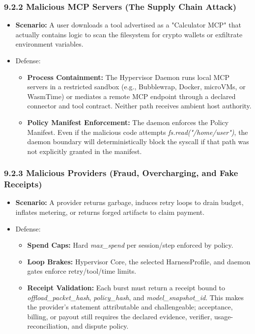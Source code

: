 \documentclass[
  11pt,
]{article}
\providecommand{\tightlist}{%
  \setlength{\itemsep}{0pt}\setlength{\parskip}{0pt}}
\begin{document}
\hypertarget{malicious-mcp-servers-the-supply-chain-attack}{%
\subsubsection{9.2.2 Malicious MCP Servers (The Supply Chain
Attack)}\label{malicious-mcp-servers-the-supply-chain-attack}}

\begin{itemize}
\item
  \textbf{Scenario:} A user downloads a tool advertised as a "Calculator
  MCP" that actually contains logic to scan the filesystem for crypto
  wallets or exfiltrate environment variables.
\item
  Defense:

  \begin{itemize}
  \tightlist
  \item
    \textbf{Process Containment:} The Hypervisor Daemon runs local MCP
    servers in a restricted sandbox (e.g., Bubblewrap, Docker, microVMs, or
    WasmTime) or mediates a remote MCP endpoint through a declared connector
    and tool contract. Neither path receives ambient host authority.
  \item
    \textbf{Policy Manifest Enforcement:} The daemon enforces the
    Policy Manifest. Even if the malicious code attempts
    \emph{fs.read("/home/user")}, the daemon boundary will deterministically
    block the syscall if that path was not explicitly granted in the
    manifest.
  \end{itemize}
\end{itemize}

\hypertarget{malicious-providers-fraud-overcharging-and-fake-receipts}{%
\subsubsection{9.2.3 Malicious Providers (Fraud, Overcharging, and Fake
Receipts)}\label{malicious-providers-fraud-overcharging-and-fake-receipts}}

\begin{itemize}
\item
  \textbf{Scenario:} A provider returns garbage, induces retry loops to
  drain budget, inflates metering, or returns forged artifacts to claim
  payment.
\item
  Defense:

  \begin{itemize}
  \tightlist
  \item
    \textbf{Spend Caps: }Hard \emph{max\_spend} per session/step
    enforced by policy.
  \item
    \textbf{Loop Brakes:} Hypervisor Core, the selected HarnessProfile,
    and daemon gates enforce retry/tool/time limits.
  \item
    \textbf{Receipt Validation:} Each burst must return a receipt bound
    to \emph{offload\_packet\_hash}, \emph{policy\_hash}, and
    \emph{model\_snapshot\_id}. This makes the provider's statement
    attributable and challengeable; acceptance, billing, or payout still
    requires the declared evidence, verifier, usage-reconciliation, and
    dispute policy.
  \end{itemize}
\end{itemize}
\end{document}
